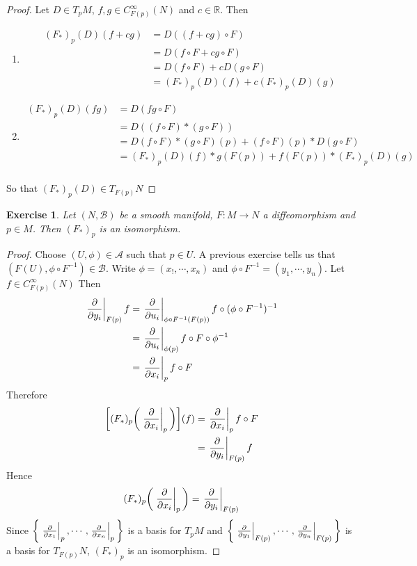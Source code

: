 \documentclass[12pt]{amsart}
\newtheorem{ex}[thm]{Exercise}
\newcommand{\R}{\mathbb{R}}
\newcommand{\MA}{\mathcal{A}}
\newcommand{\MB}{\mathcal{B}}
\begin{document}
	\begin{proof}
	Let $D \in T_pM$, $f,g \in C_{F(p)}^{\infty}(N)$ and $c \in \R$. Then 
	\begin{enumerate}
	\item 
	\begin{align*}
		(F_*)_p(D)(f+cg) 
		&= D((f+cg) \circ F) \\
		&= D(f \circ F + c g \circ F) \\
		&= D(f \circ F) + cD(g \circ F) \\
		&= (F_*)_p(D)(f) + c (F_*)_p(D)(g)
	\end{align*}
	\item 
	\begin{align*}
	(F_*)_p(D)(fg) 
	&= D (fg \circ F) \\
	&= D((f \circ F)* (g \circ F)) \\
	&= D(f \circ F)*(g \circ F)(p) +  (f \circ F)(p)* D(g \circ F) \\
	&= (F_*)_p(D)(f) * g(F(p)) + f(F(p))*(F_*)_p(D)(g) \\
	\end{align*}
	\end{enumerate}
	So that $(F_*)_p(D) \in T_{F(p)}N$
	\end{proof}

	\begin{ex}
		Let $(N, \MB)$ be a smooth manifold, $F: M \rightarrow N$ a diffeomorphism and $p \in M$. Then $(F_*)_p$ is an isomorphism.
	\end{ex}
	
	\begin{proof}
		Choose $(U, \phi) \in \MA$ such that $p \in U$. A previous exercise tells us that $(F(U), \phi \circ F^{-1}) \in \MB$. Write $\phi = (x_!, \cdots, x_n)$ and $\phi \circ F^{-1} = (y_1, \cdots, y_n)$. Let $f \in C^{\infty}_{F(p)}(N)$ Then 
		\begin{align*}
			\eval{\pdv{y_i}}_{F(p)} f
			&= 	\eval{\pdv{u_i}}_{\phi \circ F^{-1} (F(p))} f \circ (\phi \circ F^{-1})^{-1} \\
			&= 	\eval{\pdv{u_i}}_{\phi(p)} f \circ F \circ \phi^{-1} \\
			&= 	\eval{\pdv{x_i}}_p f \circ F \\
		\end{align*}
		Therefore 
		\begin{align*}
			\bigg[ (F_*)_p \bigg( \eval{\pdv{x_i}}_p \bigg) \bigg] (f)
			&= \eval{\pdv{x_i}}_p f \circ F \\
			&= \eval{\pdv{y_i}}_{F(p)} f 
		\end{align*}
	Hence $$(F_*)_p \bigg( \eval{\pdv{x_i}}_p \bigg) = \eval{\pdv{y_i}}_{F(p)}$$ 
	Since $\bigg \{\eval{\pdv{x_1}}_{p}, \cdots, \eval{\pdv{x_n}}_{p} \bigg \}$ is a basis for $T_pM$ and $\bigg \{\eval{\pdv{y_1}}_{F(p)}, \cdots, \eval{\pdv{y_n}}_{F(p)} \bigg \}$ is a basis for $T_{F(p)}N$, $(F_*)_p$ is an isomorphism.
	\end{proof}
\end{document}
